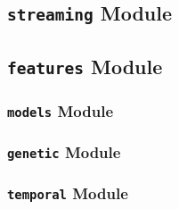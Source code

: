 \subsection{\texttt{streaming} Module}
\subsection{\texttt{features} Module}
\subsubsection{\texttt{models} Module}
\subsubsection{\texttt{genetic} Module}
\subsubsection{\texttt{temporal} Module}


